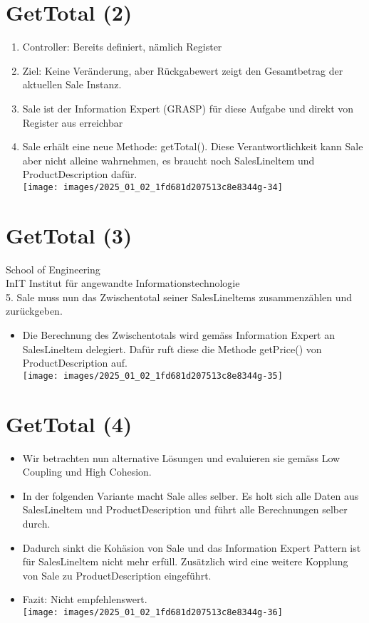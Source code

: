 \documentclass[10pt]{article}
\begin{document}
\section*{GetTotal (2)}
\begin{enumerate}
  \item Controller: Bereits definiert, nämlich Register
  \item Ziel: Keine Veränderung, aber Rückgabewert zeigt den Gesamtbetrag der aktuellen Sale Instanz.
  \item Sale ist der Information Expert (GRASP) für diese Aufgabe und direkt von Register aus erreichbar
  \item Sale erhält eine neue Methode: getTotal(). Diese Verantwortlichkeit kann Sale aber nicht alleine wahrnehmen, es braucht noch SalesLineltem und ProductDescription dafür.\\
\texttt{[image: images/2025\_01\_02\_1fd681d207513c8e8344g-34]}
\end{enumerate}

\section*{GetTotal (3)}
School of Engineering\\
InIT Institut für angewandte Informationstechnologie\\
5. Sale muss nun das Zwischentotal seiner SalesLineltems zusammenzählen und zurückgeben.

\begin{itemize}
  \item Die Berechnung des Zwischentotals wird gemäss Information Expert an SalesLineltem delegiert. Dafür ruft diese die Methode getPrice() von ProductDescription auf.\\
\texttt{[image: images/2025\_01\_02\_1fd681d207513c8e8344g-35]}
\end{itemize}

\section*{GetTotal (4)}
\begin{itemize}
  \item Wir betrachten nun alternative Lösungen und evaluieren sie gemäss Low Coupling und High Cohesion.
  \item In der folgenden Variante macht Sale alles selber. Es holt sich alle Daten aus SalesLineltem und ProductDescription und führt alle Berechnungen selber durch.
  \item Dadurch sinkt die Kohäsion von Sale und das Information Expert Pattern ist für SalesLineltem nicht mehr erfüll. Zusätzlich wird eine weitere Kopplung von Sale zu ProductDescription eingeführt.
  \item Fazit: Nicht empfehlenswert.\\
\texttt{[image: images/2025\_01\_02\_1fd681d207513c8e8344g-36]}
\end{itemize}
\end{document}
